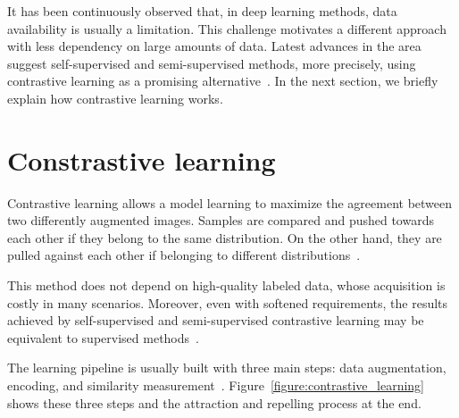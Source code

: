 \documentclass[12pt]{article}
\begin{document}

It has been continuously observed that, in deep learning methods, data availability is usually a limitation. This challenge motivates a different approach with less dependency on large amounts of data. Latest advances in the area suggest self-supervised and semi-supervised methods, more precisely, using contrastive learning as a promising alternative~\cite{guldenring2021}. %
In the next section, we briefly explain how contrastive learning works.

\section{Constrastive learning}\label{section:constrastive-learning}

Contrastive learning allows a model learning to maximize the agreement between two differently augmented images. Samples are compared and pushed towards each other if they belong to the same distribution. On the other hand, they are pulled against each other if belonging to different distributions~\cite{chen2020}.

This method does not depend on high-quality labeled data, whose acquisition is costly in many scenarios. Moreover, even with softened requirements, the results achieved by self-supervised and semi-supervised contrastive learning may be equivalent to supervised methods~\citep{chen2020}.

The learning pipeline is usually built with three main steps: data augmentation, encoding, and similarity measurement~\citep{ashish2020}. Figure~\ref{figure:contrastive_learning} shows these three steps and the attraction and repelling process at the end.
\end{document}
